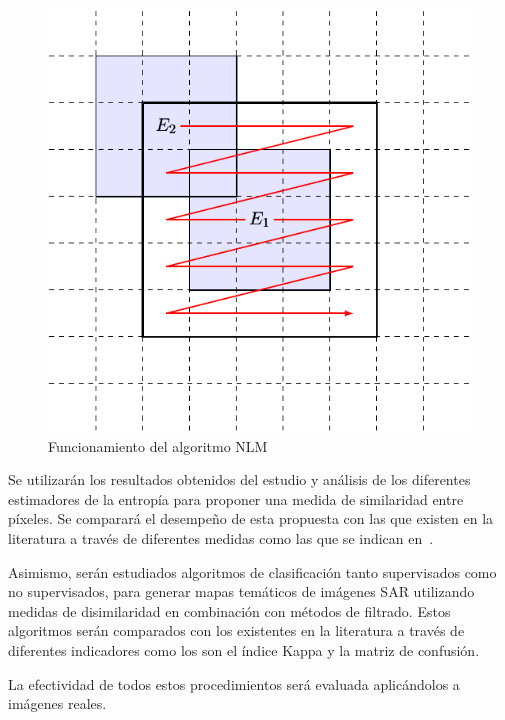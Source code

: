 \documentclass[11pt]{article}
\begin{document}
\begin{figure}[hbt]
	\label{NLM}
	\centering
	\includegraphics[scale=0.6]{../../Figures/Proyectos/UNGS2020/filtros.pdf}
	\caption{Funcionamiento del algoritmo NLM}
\end{figure}

Se utilizarán los resultados obtenidos del estudio y análisis de los diferentes estimadores de la entropía para proponer una medida de similaridad entre píxeles. Se comparará el desempeño de esta propuesta con las que existen en la literatura a través de diferentes medidas como las que se indican en~\cite{Frery2019}.

Asimismo, serán estudiados algoritmos de clasificación tanto supervisados como no supervisados, para generar mapas temáticos de imágenes SAR utilizando medidas de disimilaridad en combinación con métodos de filtrado. 
Estos algoritmos serán comparados con los existentes en la literatura a través de diferentes indicadores como los son el índice Kappa y la matriz de confusión.

La efectividad de todos estos procedimientos será evaluada aplicándolos a imágenes reales.
\end{document}
